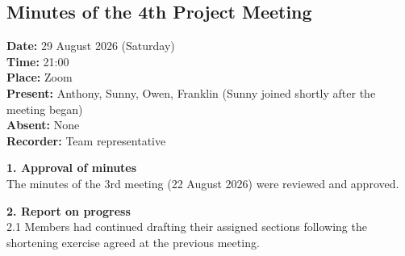 \clearpage
\enlargethispage{\baselineskip}
\subsection{Minutes of the 4th Project Meeting}

\textbf{Date:} 29 August 2026 (Saturday) \\
\textbf{Time:} 21:00 \\
\textbf{Place:} Zoom \\
\textbf{Present:} Anthony, Sunny, Owen, Franklin (Sunny joined shortly after the meeting began) \\
\textbf{Absent:} None \\
\textbf{Recorder:} Team representative

\textbf{1. Approval of minutes} \\
The minutes of the 3rd meeting (22 August 2026) were reviewed and approved.

\textbf{2. Report on progress} \\
2.1 Members had continued drafting their assigned sections following the shortening exercise agreed at the previous meeting.

